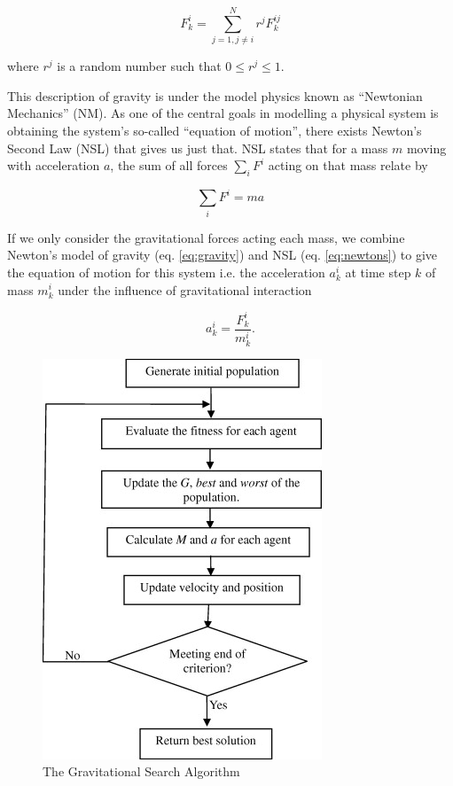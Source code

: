 \documentclass{article}
\begin{document}
            \begin{equation}\label{eq:gravity}
                F_k^i = \sum_{j = 1, j \neq i}^{N} r^j F_k^{ij}
            \end{equation}

            where $r^j$ is a random number such that $0 \leq r^j \leq 1$.

            This description of gravity is under the model physics known as ``Newtonian Mechanics'' (NM).  As one of the central goals in modelling a physical system is obtaining the system's so-called ``equation of motion'', there exists Newton's Second Law (NSL) that gives us just that.  NSL states that for a mass $m$ moving with acceleration $a$, the sum of all forces $\sum_i F^i$ acting on that mass relate by

            \begin{equation}\label{eq:newtons}
                \sum_i F^i = m a
            \end{equation}

            If we only consider the gravitational forces acting each mass, we combine Newton's model of gravity (eq. \ref{eq:gravity}) and NSL (eq. \ref{eq:newtons}) to give the equation of motion for this system i.e. the acceleration $a_k^i$ at time step $k$ of mass $m_k^i$ under the influence of gravitational interaction

            \begin{equation}\label{eq:eom}
                a_k^i = \frac{F_k^i}{m_k^i}.
            \end{equation}

            \begin{figure}
                \begin{center}
                    \includegraphics{images/GSA.jpg}
                \end{center}
                \caption{The Gravitational Search Algorithm}
            \end{figure}
\end{document}
